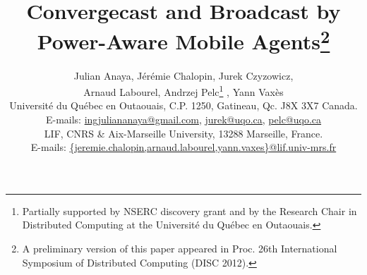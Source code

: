 \documentclass{article}
\newcommand{\inst}[1]{}
\begin{document}
\sloppy

\SetAlFnt{\small\tt}
\SetAlCapFnt{\tt}


\title{\bf {Convergecast and Broadcast by Power-Aware Mobile Agents\thanks{A preliminary version of this paper appeared in Proc. 26th International Symposium of Distributed Computing (DISC 2012).}}}






\author{
Julian Anaya\inst{1},
J\'{e}r\'{e}mie Chalopin\inst{2},
Jurek Czyzowicz\inst{1},\\
Arnaud Labourel\inst{2},
Andrzej Pelc\inst{1}\footnote{{Partially supported by NSERC discovery grant and by the Research Chair in Distributed Computing at the Universit\'e du Qu\'{e}bec en Outaouais.}} ,
Yann Vax\`es\inst{2}\\
\inst{1}Universit\'{e} du Qu\'{e}bec en Outaouais,
C.P. 1250, Gatineau, Qc. J8X 3X7
Canada.\\
E-mails: \url{ingjuliananaya@gmail.com},  \url{jurek@uqo.ca}, \url{pelc@uqo.ca}\\
\inst{2} LIF, CNRS \& Aix-Marseille University,
13288 Marseille, France.\\
E-mails: \url{{jeremie.chalopin,arnaud.labourel,yann.vaxes}@lif.univ-mrs.fr}
}


\maketitle
\end{document}
